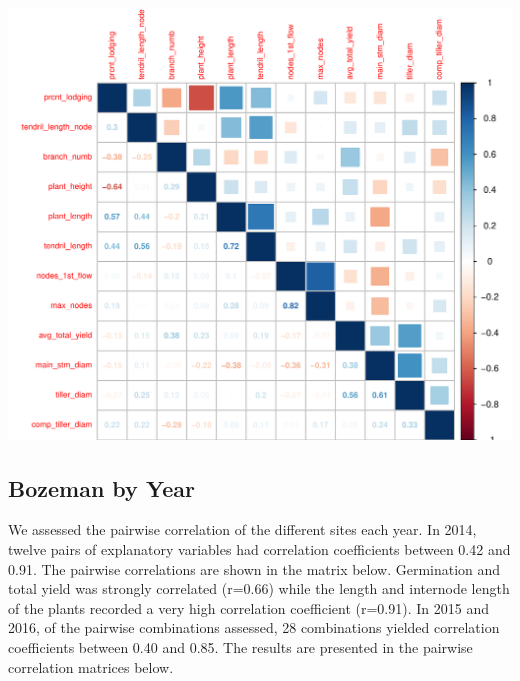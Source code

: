 \documentclass[11pt]{article}\usepackage[]{graphicx}\usepackage[]{color}
\makeatletter
\def\maxwidth{ %
  \ifdim\Gin@nat@width>\linewidth
    \linewidth
  \else
    \Gin@nat@width
  \fi
}
\newenvironment{knitrout}{}{} %
\makeatother
\begin{document}
\begin{knitrout}\footnotesize
{}\color{fgcolor}

{\centering \includegraphics[width=\maxwidth]{figure/merged-1} 

}



\end{knitrout}




\subsection{Bozeman by Year}
We assessed the pairwise correlation of the different sites each year. In 2014, twelve pairs of explanatory variables had correlation coefficients between 0.42 and 0.91. The pairwise correlations are shown in the matrix below. Germination and total yield was strongly correlated (r=0.66) while the length and internode length of the plants recorded a very high correlation coefficient (r=0.91). In 2015 and 2016, of the pairwise combinations assessed, 28 combinations yielded correlation coefficients between 0.40 and 0.85. The results are presented in the pairwise correlation matrices below.
\end{document}
